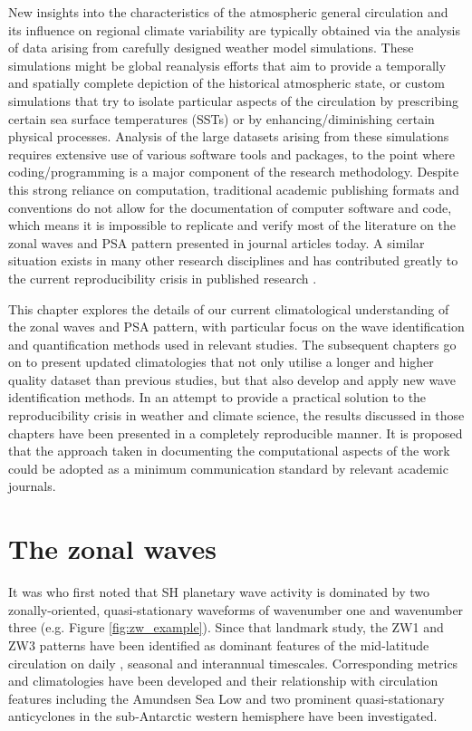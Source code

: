 New insights into the characteristics of the atmospheric general circulation and its influence on regional climate variability are typically obtained via the analysis of data arising from carefully designed weather model simulations. These simulations might be global reanalysis efforts that aim to provide a temporally and spatially complete depiction of the historical atmospheric state, or custom simulations that try to isolate particular aspects of the circulation by prescribing certain sea surface temperatures (SSTs) or by enhancing/diminishing certain physical processes. Analysis of the large datasets arising from these simulations requires extensive use of various software tools and packages, to the point where coding/programming is a major component of the research methodology. Despite this strong reliance on computation, traditional academic publishing formats and conventions do not allow for the documentation of computer software and code, which means it is impossible to replicate and verify most of the literature on the zonal waves and PSA pattern presented in journal articles today. A similar situation exists in many other research disciplines and has contributed greatly to the current reproducibility crisis in published research \citep[e.g.][]{Peng2011}.

This chapter explores the details of our current climatological understanding of the zonal waves and PSA pattern, with particular focus on the wave identification and quantification methods used in relevant studies. The subsequent chapters go on to present updated climatologies that not only utilise a longer and higher quality dataset than previous studies, but that also develop and apply new wave identification methods. In an attempt to provide a practical solution to the reproducibility crisis in weather and climate science, the results discussed in those chapters have been presented in a completely reproducible manner. It is proposed that the approach taken in documenting the computational aspects of the work could be adopted as a minimum communication standard by relevant academic journals.


\section{The zonal waves}\label{s:zw_overview}

It was \citet{vanLoon1972} who first noted that SH planetary wave activity is dominated by two zonally-oriented, quasi-stationary waveforms of wavenumber one and wavenumber three (e.g. Figure \ref{fig:zw_example}). Since that landmark study, the ZW1 and ZW3 patterns have been identified as dominant features of the mid-latitude circulation on daily \citep[e.g.][]{Kidson1988}, seasonal \citep[e.g.][]{Mo1985} and interannual \citep[e.g.][]{Karoly1989} timescales. Corresponding metrics and climatologies have been developed \citep{Raphael2004,Hobbs2007} and their relationship with circulation features including the Amundsen Sea Low \citep[ASL;][]{Turner2013} and two prominent quasi-stationary anticyclones in the sub-Antarctic western hemisphere \citep{Hobbs2010} have been investigated.

